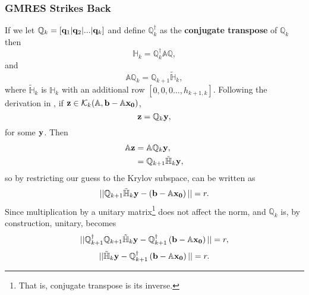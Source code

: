 \subsubsection{GMRES Strikes Back} 

If we let $\mathbb{Q}_k = [ \mathbf{q}_1| \mathbf{q}_2 | ... |\mathbf{q}_k ]$ and define $\mathbb{Q}_k^\dagger$ as the {\bf conjugate transpose} of $\mathbb{Q}_k$ then 
\begin{equation}
\mathbb{H}_k = \mathbb{Q}_k^\dagger \mathbb{A}\mathbb{Q},
\end{equation}
and 
\begin{equation}\label{eq:Qiter}
\mathbb{A}\mathbb{Q}_k = \mathbb{Q}_{k+1}\mathbb{\tilde{H}}_k,
\end{equation}
where $\mathbb{\tilde{H}}_k$ is $\mathbb{H}_k$ with an additional row $[0,0,0...,h_{k+1,k}]$. Following the derivation in , if $\mathbf{z} \in \mathcal{K}_k(\mathbb{A},{\mathbf{b}-\mathbb{A}\mathbf{x_0}})$, 
\begin{equation}
\mathbf{z} = \mathbb{Q}_k \mathbf{y},
\end{equation}
for some $\mathbf{y}$. Then 
\begin{align}
\begin{split}
\mathbb{A}\mathbf{z} &= \mathbb{A}\mathbb{Q}_{k}\mathbf{y},\\
				&= \mathbb{Q}_{k+1}\mathbb{\tilde{H}}_{k}\mathbf{y},
\end{split}
\end{align}
so by restricting our guess to the Krylov subspace,  can be written as 
\begin{equation}\label{eq:shutUpMatt}
|| \mathbb{Q}_{k+1}\tilde{\mathbb{H}}_k \mathbf{y} - \left ( \mathbf{b}-\mathbb{A}\mathbf{x_0} \right ) || = r.
\end{equation}
Since multiplication by a unitary matrix\footnote{That is, conjugate transpose is its inverse.} does not affect the norm, and $\mathbb{Q}_k$ is, by construction, unitary,  becomes
\begin{equation}\label{eq:UNIMATRIX}
|| \mathbb{Q}^{\dagger}_{k+1}\mathbb{Q}_{k+1}\tilde{\mathbb{H}}_k \mathbf{y} - \mathbb{Q}^{\dagger}_{k+1}\left ( \mathbf{b}-\mathbb{A}\mathbf{x_0} \right )|| = r,
\end{equation}
\begin{equation}
||\tilde{\mathbb{H}}_k \mathbf{y} - \mathbb{Q}^{\dagger}_{k+1}\left ( \mathbf{b}-\mathbb{A}\mathbf{x_0} \right )|| = r. 
\end{equation}

